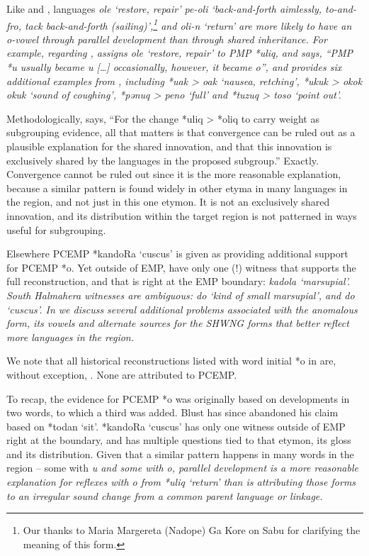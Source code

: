 Like 
and ,  languages  \it{ole} ‘restore,
repair’  \it{pe-oli} ‘back-and-forth aimlessly,
to-and-fro, tack back-and-forth (sailing)’,\footnote{
		Our thanks to Maria Margereta (Nadope) Ga Kore on Sabu for clarifying the
		meaning of this  form.} 
and  \it{oli-n} ‘return’ are more likely to have an
\it{o}-vowel through parallel development than through shared inheritance.
For example, regarding ,
\citet[89]{Blust2008} assigns  \it{ole} ‘restore,
repair’ to PMP *uliq,
and says, “PMP *u usually became \it{u} [{\ldots}] occasionally,
however, it became \it{o}”, and provides six additional examples
from , including *uak > \it{oak} ‘nausea,
retching’, *ukuk > \it{okok {\tl} okuk} ‘sound of coughing’,
*pənuq > \it{peno} ‘full’
and *tuzuq > \it{toso} ‘point out’.

Methodologically, \citet[53]{Blust2009} says, “For the change
*uliq > *oliq to carry weight as subgrouping evidence,
all that matters is that convergence can be ruled out as a plausible
explanation for the shared innovation,
and that this innovation is exclusively shared by the languages
in the proposed subgroup.” Exactly.
Convergence cannot be ruled out since it is the more reasonable
explanation, because a similar pattern is found widely in other etyma in many
languages in the region,
and not just in this one etymon.
It is not an exclusively shared innovation,
and its distribution within the target region is not patterned
in ways useful for subgrouping.

Elsewhere \citep[42]{Blust2009} PCEMP *kandoRa ‘cuscus’ is given
as providing additional support for PCEMP *o.
Yet outside of EMP,
\citet{BlustTrussel2020} have only one (!) witness that supports
the full reconstruction, and that is right at the EMP boundary:
 \it{kadola} ‘marsupial’.
South Halmahera witnesses are ambiguous:  \it{do} ‘kind of
small marsupial’, and  \it{do} ‘cuscus’.
In  we discuss several additional problems associated
with the anomalous  form,
its vowels and alternate sources for the SHWNG forms that better
reflect more languages in the region.

We note that all historical reconstructions listed with word
initial *o in \citet{BlustTrussel2020} are, without exception, .
None are attributed to PCEMP.

To recap, the evidence for PCEMP *o was originally based on developments
in two words, to which a third was added.
Blust has since abandoned his claim based on *todan ‘sit’.
*kandoRa ‘cuscus’ has only one witness outside of EMP right at
the boundary, and has multiple questions tied to that etymon,
its gloss and its distribution.
Given that a similar pattern happens in many words in the region -- some
with \it{u} and some with \it{o},
parallel development is a more reasonable explanation for reflexes
with \it{o} from *uliq ‘return’ than is attributing those forms
to an irregular sound change from a common parent language or linkage.